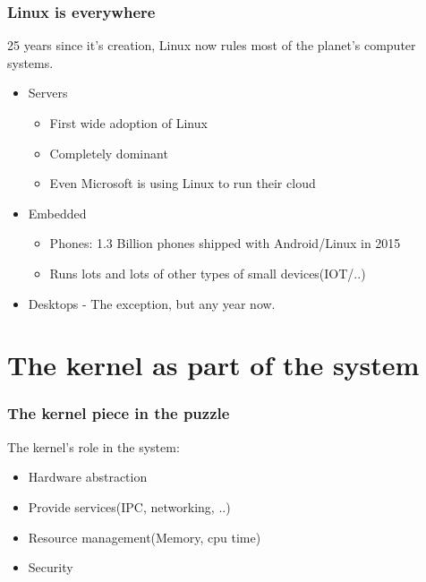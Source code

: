 \documentclass{beamer}
\begin{document}
\begin{frame}
\frametitle{Linux is everywhere}
25 years since it's creation, Linux now rules most of the planet's computer systems. \\
\begin{itemize}
	\item Servers
	\begin{itemize}
		\item First wide adoption of Linux
		\item Completely dominant
		\item Even Microsoft is using Linux to run their cloud
	\end{itemize}
	\item Embedded 
	\begin{itemize}
		\item Phones: 1.3 Billion phones shipped with Android/Linux in 2015
		\item Runs lots and lots of other types of small devices(IOT/..)
	\end{itemize}
	\item Desktops - The exception, but any year now. 
\end{itemize}

\end{frame}

\section{The kernel as part of the system}

\begin{frame}
\frametitle{The kernel piece in the puzzle}
The kernel's role in the system: \\
\begin{itemize}
	\item Hardware abstraction
	\item Provide services(IPC, networking, ..)
	\item Resource management(Memory, cpu time)
	\item Security
\end{itemize}
\end{frame}
\end{document}
